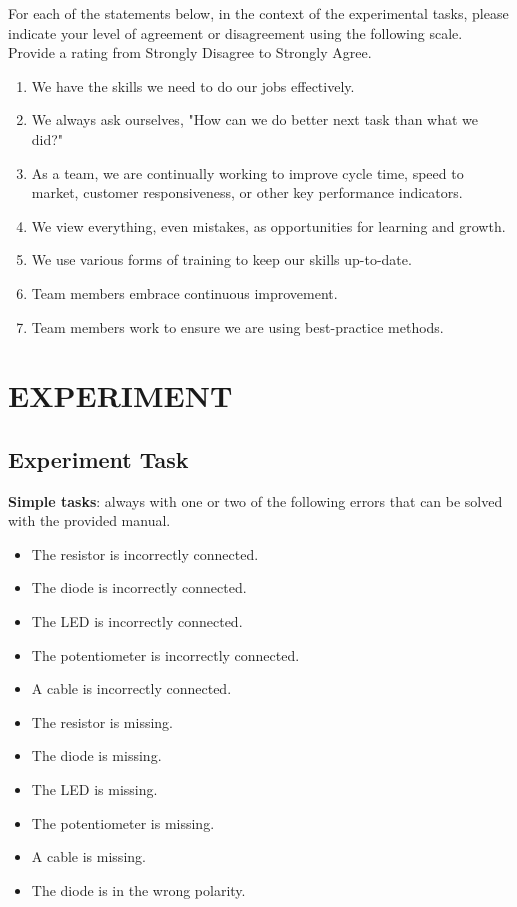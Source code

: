 \documentclass[msom,nonblindrev]{01 latex/class/informs3}
\begin{document}
\begin{APPENDICES}
\vspace{5mm}
For each of the statements below, in the context of the experimental tasks, please indicate your level of agreement or disagreement using the following scale. Provide a rating from Strongly Disagree to Strongly Agree. 

\begin{enumerate}
    \item We have the skills we need to do our jobs effectively.
    \item We always ask ourselves, "How can we do better next task than what we did?"
    \item As a team, we are continually working to improve cycle time, speed to market, customer responsiveness, or other key performance indicators.
    \item We view everything, even mistakes, as opportunities for learning and growth.
    \item We use various forms of training to keep our skills up-to-date.
    \item Team members embrace continuous improvement.
    \item Team members work to ensure we are using best-practice methods.
\end{enumerate}

\section{EXPERIMENT}

\subsection{Experiment Task}

\textbf{Simple tasks}: always with one or two of the following errors that can be solved with the provided manual.

\begin{itemize}
\item The resistor is incorrectly connected.
\item The diode is incorrectly connected.
\item The LED is incorrectly connected.
\item The potentiometer is incorrectly connected.
\item A cable is incorrectly connected.
\item The resistor is missing.
\item The diode is missing.
\item The LED is missing.
\item The potentiometer is missing.
\item A cable is missing.
\item The diode is in the wrong polarity.
\end{itemize}


\end{APPENDICES}
\end{document}
